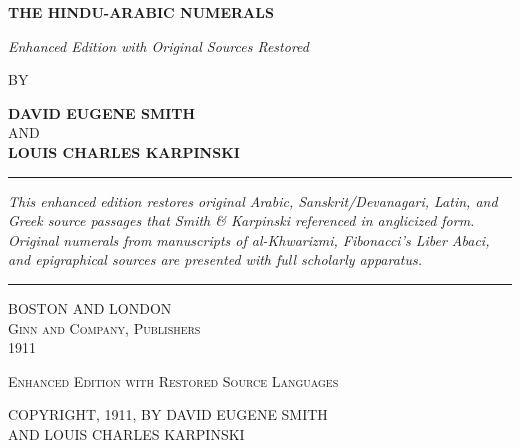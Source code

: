 \documentclass[11pt,a4paper]{article}
\newcommand{\shortline}{\noindent\rule{0.5\textwidth}{0.4pt}\par}
\begin{document}
\thispagestyle{empty}
\begin{center}
\vspace*{1.5cm}

{\Huge\bfseries\color{titlecolor} THE HINDU-ARABIC NUMERALS}

\vspace{0.8cm}

{\large\color{notecolor}\textit{Enhanced Edition with Original Sources Restored}}

\vspace{1.2cm}

{\Large BY}

\vspace{0.5cm}

{\LARGE\bfseries DAVID EUGENE SMITH}\\[0.3cm]
{\large AND}\\[0.3cm]
{\LARGE\bfseries LOUIS CHARLES KARPINSKI}

\vspace{1.5cm}

\shortline

\vspace{0.8cm}

\begin{minipage}{0.85\textwidth}
\small\centering
\textit{This enhanced edition restores original Arabic, Sanskrit/Devanagari, Latin, and Greek source passages that Smith \& Karpinski referenced in anglicized form. Original numerals from manuscripts of al-Khwarizmi, Fibonacci's \textit{Liber Abaci}, and epigraphical sources are presented with full scholarly apparatus.}
\end{minipage}

\vspace{1cm}

\shortline

\vspace{0.5cm}

{\large BOSTON AND LONDON}\\[0.2cm]
{\large\scshape Ginn and Company, Publishers}\\[0.3cm]
{\large 1911}

\vspace{0.8cm}

{\small\textsc{Enhanced Edition with Restored Source Languages}}

\vfill

{\small COPYRIGHT, 1911, BY DAVID EUGENE SMITH}\\[0.1cm]
{\small AND LOUIS CHARLES KARPINSKI}

\vspace{0.5cm}
\end{center}
\newpage
\end{document}
